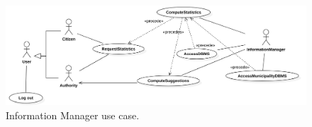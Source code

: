 \documentclass{report}
\begin{document}
\begin{figure}[ht!]
	\begin{center}
	\includegraphics[width=\textwidth]{./img/UseCase3.png}
	\end{center}
	\caption{Information Manager use case.}
	\label{fig:UseCase3}
	\end{figure}
	\newpage
\end{document}
